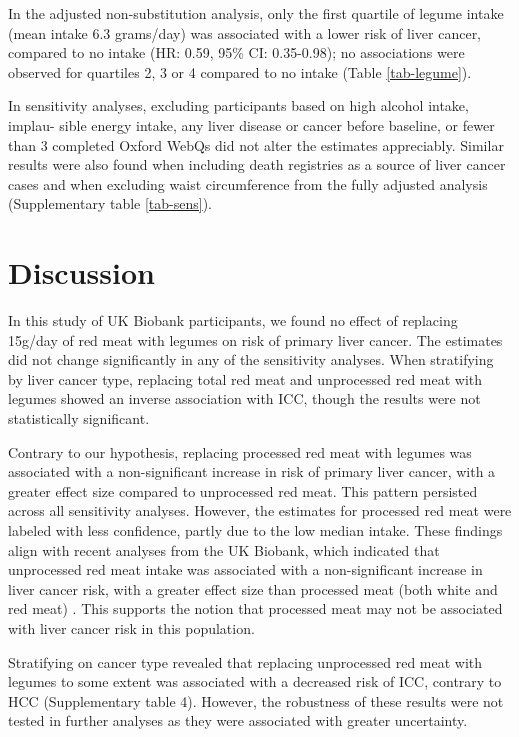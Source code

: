 \documentclass[sn-basic,Numbered,iicol,pdflatex]{sn-jnl}
\begin{document}
In the adjusted non-substitution analysis, only the first quartile of
legume intake (mean intake 6.3 grams/day) was associated with a lower
risk of liver cancer, compared to no intake
(HR: 0.59, 95\% CI: 0.35-0.98);
no associations were observed for quartiles 2, 3 or 4 compared to no
intake (Table \ref{tab-legume}).

In sensitivity analyses, excluding participants based on high alcohol
intake, implau- sible energy intake, any liver disease or cancer before
baseline, or fewer than 3 completed Oxford WebQs did not alter the
estimates appreciably. Similar results were also found when including
death registries as a source of liver cancer cases and when excluding
waist circumference from the fully adjusted analysis (Supplementary
table \ref{tab-sens}).

\hypertarget{sec4}{%
\section{Discussion}\label{sec4}}

In this study of UK Biobank participants, we found no effect of
replacing 15g/day of red meat with legumes on risk of primary liver
cancer. The estimates did not change significantly in any of the
sensitivity analyses. When stratifying by liver cancer type, replacing
total red meat and unprocessed red meat with legumes showed an inverse
association with ICC, though the results were not statistically
significant.

Contrary to our hypothesis, replacing processed red meat with legumes
was associated with a non-significant increase in risk of primary liver
cancer, with a greater effect size compared to unprocessed red meat.
This pattern persisted across all sensitivity analyses. However, the
estimates for processed red meat were labeled with less confidence,
partly due to the low median intake. These findings align with recent
analyses from the UK Biobank, which indicated that unprocessed red meat
intake was associated with a non-significant increase in liver cancer
risk, with a greater effect size than processed meat (both white and red
meat) \citep{Knuppel2020}. This supports the notion that processed meat may
not be associated with liver cancer risk in this population.

Stratifying on cancer type revealed that replacing unprocessed red meat
with legumes to some extent was associated with a decreased risk of ICC,
contrary to HCC (Supplementary table 4). However, the robustness of
these results were not tested in further analyses as they were
associated with greater uncertainty.
\end{document}
